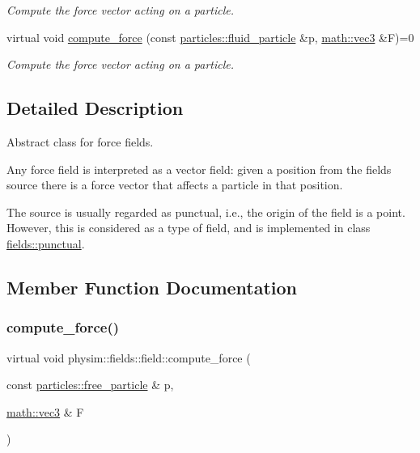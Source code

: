 \begin{DoxyCompactItemize}
\begin{DoxyCompactList}\small\item\em Compute the force vector acting on a particle. \end{DoxyCompactList}\item 
virtual void \hyperlink{classphysim_1_1fields_1_1field_a099fb8b1dee7afae4610c6275432bc81}{compute\+\_\+force} (const \hyperlink{classphysim_1_1particles_1_1fluid__particle}{particles\+::fluid\+\_\+particle} \&p, \hyperlink{structphysim_1_1math_1_1vec3}{math\+::vec3} \&F)=0
\begin{DoxyCompactList}\small\item\em Compute the force vector acting on a particle. \end{DoxyCompactList}\end{DoxyCompactItemize}


\subsection{Detailed Description}
Abstract class for force fields. 

Any force field is interpreted as a vector field\+: given a position from the field\textquotesingle{}s source there is a force vector that affects a particle in that position.

The source is usually regarded as punctual, i.\+e., the origin of the field is a point. However, this is considered as a type of field, and is implemented in class \hyperlink{classphysim_1_1fields_1_1punctual}{fields\+::punctual}. 

\subsection{Member Function Documentation}
\mbox{\label{classphysim_1_1fields_1_1field_a0d836756ac51a6a1e99d3c9a60310694}} 
\subsubsection{\texorpdfstring{compute\+\_\+force()}{compute\_force()}\hspace{0.1cm}{\footnotesize\ttfamily [1/3]}}
{\footnotesize\ttfamily virtual void physim\+::fields\+::field\+::compute\+\_\+force (\begin{DoxyParamCaption}\item[{const \hyperlink{classphysim_1_1particles_1_1free__particle}{particles\+::free\+\_\+particle} \&}]{p,  }\item[{\hyperlink{structphysim_1_1math_1_1vec3}{math\+::vec3} \&}]{F }\end{DoxyParamCaption})\hspace{0.3cm}{\ttfamily [pure virtual]}}




